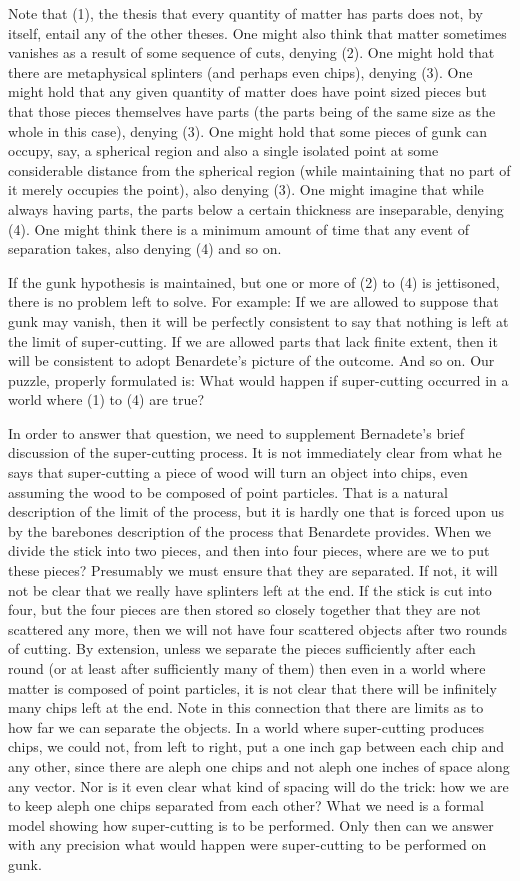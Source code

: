\documentclass[
  10pt,
  letterpaper,
  DIV=11,
  numbers=noendperiod,
  twoside]{scrartcl}
\begin{document}
Note that (1), the thesis that every quantity of matter has parts does
not, by itself, entail any of the other theses. One might also think
that matter sometimes vanishes as a result of some sequence of cuts,
denying (2). One might hold that there are metaphysical splinters (and
perhaps even chips), denying (3). One might hold that any given quantity
of matter does have point sized pieces but that those pieces themselves
have parts (the parts being of the same size as the whole in this case),
denying (3). One might hold that some pieces of gunk can occupy, say, a
spherical region and also a single isolated point at some considerable
distance from the spherical region (while maintaining that no part of it
merely occupies the point), also denying (3). One might imagine that
while always having parts, the parts below a certain thickness are
inseparable, denying (4). One might think there is a minimum amount of
time that any event of separation takes, also denying (4) and so on.

If the gunk hypothesis is maintained, but one or more of (2) to (4) is
jettisoned, there is no problem left to solve. For example: If we are
allowed to suppose that gunk may vanish, then it will be perfectly
consistent to say that nothing is left at the limit of super-cutting. If
we are allowed parts that lack finite extent, then it will be consistent
to adopt Benardete's picture of the outcome. And so on. Our puzzle,
properly formulated is: What would happen if super-cutting occurred in a
world where (1) to (4) are true?

In order to answer that question, we need to supplement Bernadete's
brief discussion of the super-cutting process. It is not immediately
clear from what he says that super-cutting a piece of wood will turn an
object into chips, even assuming the wood to be composed of point
particles. That is a natural description of the limit of the process,
but it is hardly one that is forced upon us by the barebones description
of the process that Benardete provides. When we divide the stick into
two pieces, and then into four pieces, where are we to put these pieces?
Presumably we must ensure that they are separated. If not, it will not
be clear that we really have splinters left at the end. If the stick is
cut into four, but the four pieces are then stored so closely together
that they are not scattered any more, then we will not have four
scattered objects after two rounds of cutting. By extension, unless we
separate the pieces sufficiently after each round (or at least after
sufficiently many of them) then even in a world where matter is composed
of point particles, it is not clear that there will be infinitely many
chips left at the end. Note in this connection that there are limits as
to how far we can separate the objects. In a world where super-cutting
produces chips, we could not, from left to right, put a one inch gap
between each chip and any other, since there are aleph one chips and not
aleph one inches of space along any vector. Nor is it even clear what
kind of spacing will do the trick: how we are to keep aleph one chips
separated from each other? What we need is a formal model showing how
super-cutting is to be performed. Only then can we answer with any
precision what would happen were super-cutting to be performed on gunk.
\end{document}
